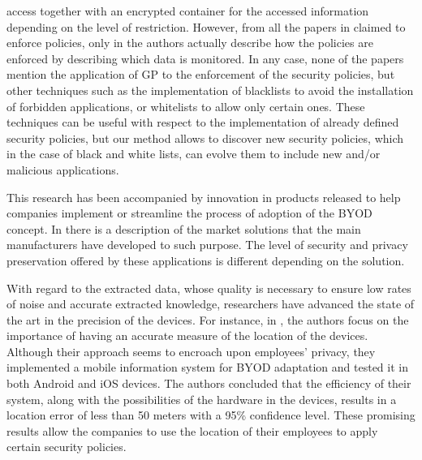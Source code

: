 \documentclass[a4paper,10pt,twocolumn,preprint,3p]{elsarticle}
\begin{document}
access together with an encrypted container for the accessed
information depending on the level of restriction. However, from all
the papers in \cite{ali2015analysis} claimed to enforce policies, only
in \cite{rhee2013high} the authors actually describe how the policies
are enforced by describing which data is monitored. In any case, none
of the papers mention the application of GP to the enforcement of the
security policies, but other techniques such as the implementation of
blacklists to avoid the installation of forbidden applications, or
whitelists to allow only certain ones. These techniques can be useful
with respect to the implementation of already defined security
policies, but our method allows to discover new security policies,
which in the case of black and white lists, can evolve them to include
new and/or malicious applications. 

This research has been accompanied by innovation in products released
to help companies implement or streamline the process of adoption of the BYOD
concept. In \cite{de2015corporate} there is a description of the
market solutions that the main manufacturers have developed to such
purpose. The level of security and privacy preservation offered by
these applications is different depending on the solution. %

With regard to the extracted data, whose quality is necessary to
ensure low rates of noise  %
and accurate extracted knowledge,
researchers have advanced the state of the art in the precision of the
devices. For instance, in \cite{rios2015mobile}, the authors focus on
the importance of having an accurate measure of the location of the
devices. Although their approach seems to encroach upon employees'
privacy, they implemented a mobile information system for BYOD
adaptation and tested it in both Android and iOS devices. The authors
concluded that the efficiency of their system, along with the
possibilities of the hardware in the devices, results in a location
error of less than 50 meters with a 95\% confidence level. These
promising results allow the companies to use the location of their
employees to apply certain security policies.   
\end{document}

